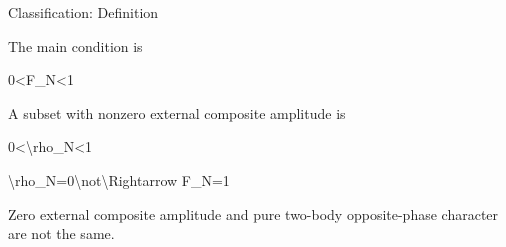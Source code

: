 \documentclass[
  a4paper,
]{article}
\newenvironment{Shaded}{}{}
\newcommand{\NormalTok}[1]{#1}
\begin{document}
Classification: Definition

The main condition is

\begin{Shaded}
\begin{Highlighting}[]
\NormalTok{0\textless{}F\_N\textless{}1}
\end{Highlighting}
\end{Shaded}

A subset with nonzero external composite amplitude is

\begin{Shaded}
\begin{Highlighting}[]
\NormalTok{0\textless{}\textbackslash{}rho\_N\textless{}1}
\end{Highlighting}
\end{Shaded}

\begin{Shaded}
\begin{Highlighting}[]
\NormalTok{\textbackslash{}rho\_N=0\textbackslash{}not\textbackslash{}Rightarrow F\_N=1}
\end{Highlighting}
\end{Shaded}

Zero external composite amplitude and pure two-body opposite-phase
character are not the same.
\end{document}
